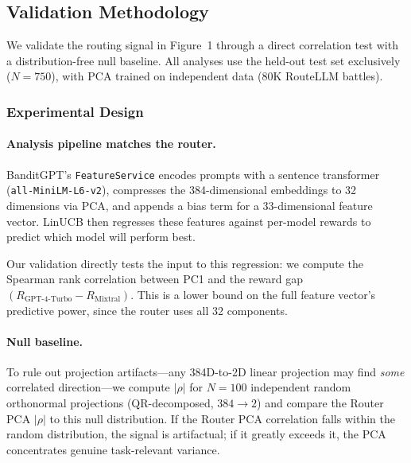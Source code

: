 
\subsection{Validation Methodology}
\label{sec:validation_methodology}

We validate the routing signal in Figure~1 through a direct correlation test
with a distribution-free null baseline.  All analyses use the held-out test set
exclusively ($N=750$), with PCA trained on independent data (80K RouteLLM
battles).

\subsubsection{Experimental Design}

\paragraph{Analysis pipeline matches the router.}
BanditGPT's \texttt{FeatureService} encodes prompts with a sentence
transformer (\texttt{all-MiniLM-L6-v2}), compresses the 384-dimensional
embeddings to 32 dimensions via PCA, and appends a bias term for a
33-dimensional feature vector.  LinUCB then regresses these features against
per-model rewards to predict which model will perform best.

Our validation directly tests the input to this regression: we compute the
Spearman rank correlation between PC1 and the reward gap
$(R_{\text{GPT-4-Turbo}} - R_{\text{Mixtral}})$.  This is a lower bound on
the full feature vector's predictive power, since the router uses all 32
components.

\paragraph{Null baseline.}
To rule out projection artifacts---any 384D-to-2D linear projection may find
\emph{some} correlated direction---we compute $|\rho|$ for $N{=}100$
independent random orthonormal projections (QR-decomposed, $384 \to 2$) and
compare the Router PCA $|\rho|$ to this null distribution.  If the Router PCA
correlation falls within the random distribution, the signal is artifactual; if
it greatly exceeds it, the PCA concentrates genuine task-relevant variance.

